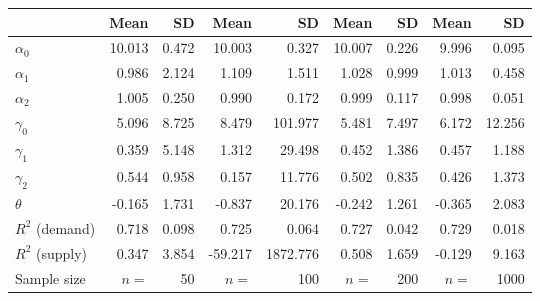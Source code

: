 
\begin{tabular}[t]{lrrrrrrrr}
\toprule
  & Mean & SD & Mean  & SD  & Mean   & SD   & Mean    & SD   \\
\midrule
$\alpha_{0}$ & 10.013 & 0.472 & 10.003 & 0.327 & 10.007 & 0.226 & 9.996 & 0.095\\
$\alpha_{1}$ & 0.986 & 2.124 & 1.109 & 1.511 & 1.028 & 0.999 & 1.013 & 0.458\\
$\alpha_{2}$ & 1.005 & 0.250 & 0.990 & 0.172 & 0.999 & 0.117 & 0.998 & 0.051\\
$\gamma_{0}$ & 5.096 & 8.725 & 8.479 & 101.977 & 5.481 & 7.497 & 6.172 & 12.256\\
$\gamma_{1}$ & 0.359 & 5.148 & 1.312 & 29.498 & 0.452 & 1.386 & 0.457 & 1.188\\
$\gamma_{2}$ & 0.544 & 0.958 & 0.157 & 11.776 & 0.502 & 0.835 & 0.426 & 1.373\\
$\theta$ & -0.165 & 1.731 & -0.837 & 20.176 & -0.242 & 1.261 & -0.365 & 2.083\\
$R^{2}$ (demand) & 0.718 & 0.098 & 0.725 & 0.064 & 0.727 & 0.042 & 0.729 & 0.018\\
$R^{2}$ (supply) & 0.347 & 3.854 & -59.217 & 1872.776 & 0.508 & 1.659 & -0.129 & 9.163\\
Sample size & $n =$ & 50 & $n =$ & 100 & $n =$ & 200 & $n =$ & 1000\\
\bottomrule
\end{tabular}
